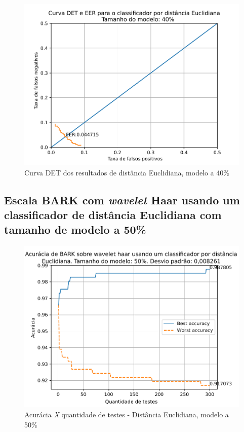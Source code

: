 			\begin{figure}[ht]
				\centering
				\includegraphics[width=\linewidth]{images/results/det/DET_for_classifier_Euclidian_40}
				\caption{Curva DET dos resultados de distância Euclidiana, modelo a 40\%}
				\label{fig:detforclassifiereuclidian40}
			\end{figure}

			\forceNewPage
		\subsection{Escala BARK com \textit{wavelet} Haar usando um classificador de distância Euclidiana com tamanho de modelo a 50\%}
		
			
			
			\begin{figure}[ht]
				\centering
				\includegraphics[width=\linewidth]{images/results/confusionMatrices/classifier_Euclidian_50}
				\caption{Acurácia \textit{X} quantidade de testes - Distância Euclidiana, modelo a 50\%}
				\label{fig:classifiereuclidian50}
			\end{figure}
		
